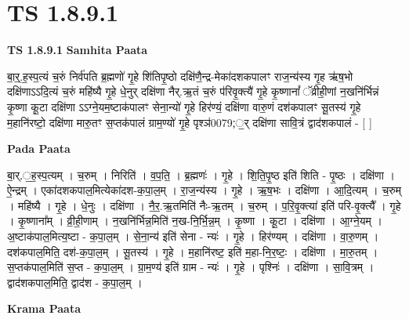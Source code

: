 \documentclass[17pt]{extarticle}
\begin{document}
\section{ TS 1.8.9.1 }

\textbf{TS 1.8.9.1 } \newline
\textbf{Samhita Paata} \newline

बा॒र्॒.ह॒स्प॒त्यं च॒रुं निर्व॑पति ब्र॒ह्मणो॑ गृ॒हे शि॑तिपृ॒ष्ठो दक्षि॑णै॒न्द्र-मेका॑दशकपालꣳ राज॒न्य॑स्य गृ॒ह ऋ॑ष॒भो दक्षि॑णाऽऽदि॒त्यं च॒रुं महि॑ष्यै गृ॒हे धे॒नुर् दक्षि॑णा नैर्.ऋ॒तं च॒रुं प॑रिवृ॒क्त्यै॑ गृ॒हे कृ॒ष्णानां᳚ ॅव्रीही॒णां न॒खनि॑र्भिन्नं कृ॒ष्णा कू॒टा दक्षि॑णा ऽऽग्ने॒यम॒ष्टाक॑पालꣳ सेना॒न्यो॑ गृ॒हे हिर॑ण्यं॒ दक्षि॑णा वारु॒णं दश॑कपालꣳ सू॒तस्य॑ गृ॒हे म॒हानि॑रष्टो॒ दक्षि॑णा मारु॒तꣳ स॒प्तक॑पालं ग्राम॒ण्यो॑ गृ॒हे पृश्ञ॑0079;॒र् दक्षि॑णा सावि॒त्रं द्वाद॑शकपालं - [ ] \newline

\textbf{Pada Paata} \newline

बा॒र्.॒ह॒स्प॒त्यम् । च॒रुम् । निरिति॑ । व॒प॒ति॒ । ब्र॒ह्मणः॑ । गृ॒हे । शि॒ति॒पृ॒ष्ठ इति॑ शिति - पृ॒ष्ठः । दक्षि॑णा । ऐ॒न्द्रम् । एका॑दशकपाल॒मित्येका॑दश-क॒पा॒ल॒म् । रा॒ज॒न्य॑स्य । गृ॒हे । ऋ॒ष॒भः । दक्षि॑णा । आ॒दि॒त्यम् । च॒रुम् । महि॑ष्यै । गृ॒हे । धे॒नुः । दक्षि॑णा । नै॒र॒.ऋ॒तमिति॑ नैः-ऋ॒तम् । च॒रुम् । प॒रि॒वृ॒क्त्या॑ इति॑ परि-वृ॒क्त्यै᳚ । गृ॒हे । कृ॒ष्णाना᳚म् । व्री॒ही॒णाम् । न॒खनि॑र्भिन्न॒मिति॑ न॒ख-नि॒र्भि॒न्न॒म् । कृ॒ष्णा । कू॒टा । दक्षि॑णा । आ॒ग्ने॒यम् । अ॒ष्टाक॑पाल॒मित्य॒ष्टा - क॒पा॒ल॒म् । से॒ना॒न्य॑ इति॑ सेना - न्यः॑ । गृ॒हे । हिर॑ण्यम् । दक्षि॑णा । वा॒रु॒णम् । दश॑कपाल॒मिति॒ दश॑-क॒पा॒ल॒म् । सू॒तस्य॑ । गृ॒हे । म॒हानि॑रष्ट॒ इति॑ म॒हा-नि॒र॒ष्टः॒ । दक्षि॑णा । मा॒रु॒तम् । स॒प्तक॑पाल॒मिति॑ स॒प्त - क॒पा॒ल॒म् । ग्रा॒म॒ण्य॑ इति॑ ग्राम - न्यः॑ । गृ॒हे । पृश्निः॑ । दक्षि॑णा । सा॒वि॒त्रम् । द्वाद॑शकपाल॒मिति॒ द्वाद॑श - क॒पा॒ल॒म् ।  \newline


\textbf{Krama Paata} \newline
\end{document}

